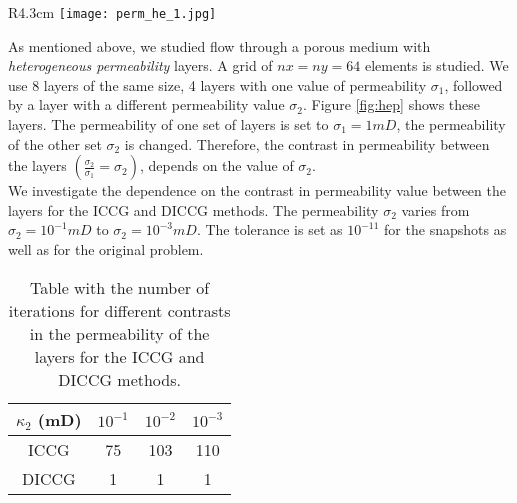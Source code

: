 \documentclass[12pt]{article}
\numberwithin{equation}{section}
\begin{document}
\begin{wrapfigure}{R}{4.3cm}
\centering 
\vspace{-10pt}
\texttt{[image: perm\_he\_1.jpg]}
 \vspace{-20pt}
\caption{ Heterogeneous permeability, 4 wells.}\label{fig:hep}
\vspace{-15pt}
\end{wrapfigure}

\normalsize
As mentioned above, we studied flow through a porous medium with \emph{heterogeneous permeability} layers. A grid of
$nx = ny = 64$ elements is studied. We use 8 layers of the same size, 
4 layers with one value of permeability $\sigma_1$, followed by a layer with a different permeability value $\sigma_2$. Figure \ref{fig:hep} shows these layers. The permeability of one set of layers is set to $\sigma_1=1mD$, the permeability of the other set $\sigma_2$ is changed. 
Therefore, the contrast in permeability between the layers $(\frac{\sigma_2}{\sigma_1}=\sigma_2)$,
depends on the value of $\sigma_2$.\\
We investigate the dependence on the contrast in permeability value between the layers for the ICCG and DICCG methods.
The permeability  $\sigma_2$ varies from $\sigma_2=10^{-1}mD$ to $\sigma_2=10^{-3}mD$. 
 The tolerance is set as $10^{-11}$ for the snapshots as well as for the original problem.\\
\renewcommand{\arraystretch}{1.3}
\begin{table}[!ht]
\centering
\begin{minipage}{.65\textwidth}
\vspace{-20pt}
\centering
\begin{tabular}{ |c|c|c|c|} 
\hline
 $\kappa_2$ (mD) & $10^{-1}$& $10^{-2}$ & $10^{-3}$ \\
 \hline
  ICCG  & 75& 103&110\\ 
 
  DICCG  & 1 & 1& 1\\ 
 \hline
\end{tabular}
\caption{Table with the number of iterations for different contrasts in the permeability of the layers
for the ICCG and DICCG methods.}
\label{table:hei}\end{minipage}
\vspace{-10pt}
\end{table}
\end{document}
